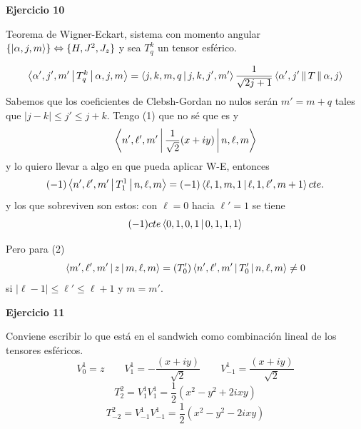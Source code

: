 \documentclass[10pt,oneside]{CBFT_book}
\begin{document}
\begin{ejemplo}{\bf Ejercicio 10}
 
Teorema de Wigner-Eckart, sistema con momento angular 
$\{ \Ket{\alpha,j,m} \} \Leftrightarrow \{ H, J^2, J_z \} $  y sea $T_q^k$ un tensor esférico.

\[
	\Braket{ \alpha', j', m' | T_q^k | \alpha, j, m } = 
	\Braket{j,k,m,q|j,k,j',m'} 
	\frac{1}{\sqrt{2j+1}} 
	\Braket{\alpha',j'||T||\alpha,j}
\]
Sabemos que los coeficientes de Clebsh-Gordan no nulos serán $ m' = m + q $ tales que
$ |j-k| \leq j' \leq j + k $.
Tengo (1) que no sé que es y 
\[
	\Braket{ n', \ell', m' |\frac{1}{\sqrt{2}}(x+iy)| n, \ell, m }
\]
y lo quiero llevar a algo en que pueda aplicar W-E, entonces
\[
	(-1) \Braket{ n', \ell', m' | T_1^1 | n, \ell, m} = 
	(-1) \Braket{ \ell, 1, m, 1 | \ell, 1, \ell', m+1 } cte.
\]
y los que sobreviven son estos: con $\ell=0$ hacia $\ell'=1$ se tiene
\[
	(-1) cte \Braket{ 0, 1, 0, 1 | 0, 1, 1, 1 } 
\]
 
Pero para (2) 
\[
	\Braket{m',\ell',m'|z|m,\ell,m} = (T_0')
	\Braket{n',\ell',m'|T_0'|n,\ell,m} \neq 0
\]
si $|\ell-1|\leq \ell' \leq \ell +1 $ y $ m = m' $.
 
\end{ejemplo}


\begin{ejemplo}{\bf Ejercicio 11}

Conviene escribir lo que está en el sandwich como combinación lineal de los tensores esféricos.
\[
	V_0^1 = z 
	\qquad 
	V_1^1 = - \frac{(x+iy)}{\sqrt{2}} 
	\qquad 
	V_{-1}^1 = \frac{(x+iy)}{\sqrt{2}} 
\]
\[
	T_2^2 = V_1^1 V_1^1 = \frac{1}{2}( x^2 - y^2 + 2 i x y )
\]
\[
	T_{-2}^2 = V_{-1}^1 V_{-1}^1 = \frac{1}{2}( x^2 - y^2 - 2 i x y )
\]

\end{ejemplo}



\end{document}
